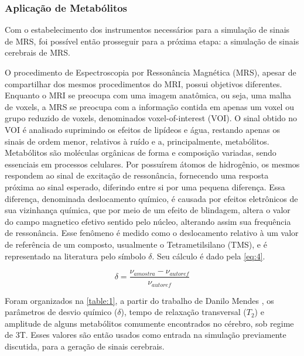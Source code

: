 \documentclass{article}
\begin{document}
\subsubsection{Aplicação de Metabólitos}
\label{sec:metabolites}

Com o estabelecimento dos instrumentos necessários para a simulação de sinais de MRS, foi possível então prosseguir para a próxima etapa:
a simulação de sinais cerebrais de MRS.

O procedimento de Espectroscopia por Ressonância Magnética (MRS), apesar de compartilhar dos mesmos procedimentos do MRI, possui objetivos 
diferentes. Enquanto o MRI se preocupa com uma imagem anatômica, ou seja, uma malha de voxels, a MRS se preocupa com a informação contida em apenas um voxel ou grupo 
reduzido de voxels, denominados voxel-of-interest (VOI). O sinal obtido no VOI é analisado suprimindo os efeitos de lipídeos e água, restando 
apenas os sinais de ordem menor, relativos à ruído e a, principalmente, metabólitos. Metabólitos são moléculas orgânicas de forma e composição 
variadas, sendo essenciais em processos celulares. Por possuírem átomos de hidrogênio, os mesmos respondem ao sinal de excitação 
de ressonância, fornecendo uma resposta próxima ao sinal esperado, diferindo entre si por uma pequena diferença. Essa diferença, denominada deslocamento químico, 
é causada por efeitos eletrônicos de sua vizinhança química, que por meio de um efeito de blindagem, altera o valor do campo magnetico efetivo sentido pelo núcleo, 
alterando assim sua frequência de ressonância. Esse fenômeno é medido como o deslocamento relativo à um valor de referência de um composto, usualmente o 
Tetrametilsilano (TMS), e é representado na literatura pelo símbolo $\delta$. Seu cálculo é dado pela \autoref{eq:4}.

\begin{equation} \label{eq:4}
    \delta = \frac{\nu _{amostra} - \nu _{autoref}}{\nu _{autoref}}
\end{equation}


Foram organizados na \autoref{table:1}, a partir do trabalho de Danilo Mendes \cite{Silva2020-io}, os parâmetros de desvio químico ($\delta$), tempo de relaxação 
transversal ($T_2$) e amplitude de alguns metabólitos comumente encontrados no cérebro, sob regime de 3T. Esses valores são então usados como entrada na simulação
previamente discutida, para a geração de sinais cerebrais. 
\end{document}
